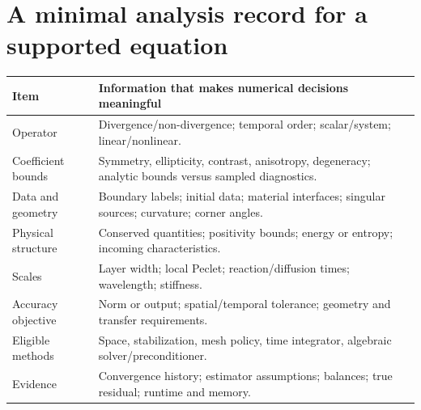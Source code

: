 \documentclass[11pt,a4paper]{article}
\begin{document}
\section{A minimal analysis record for a supported equation}
\begin{tabularx}{\textwidth}{P{0.30\textwidth}Y}
\toprule
Item & Information that makes numerical decisions meaningful\\
\midrule
Operator & Divergence/non-divergence; temporal order; scalar/system; linear/nonlinear.\\
Coefficient bounds & Symmetry, ellipticity, contrast, anisotropy, degeneracy; analytic bounds versus sampled diagnostics.\\
Data and geometry & Boundary labels; initial data; material interfaces; singular sources; curvature; corner angles.\\
Physical structure & Conserved quantities; positivity bounds; energy or entropy; incoming characteristics.\\
Scales & Layer width; local Peclet; reaction/diffusion times; wavelength; stiffness.\\
Accuracy objective & Norm or output; spatial/temporal tolerance; geometry and transfer requirements.\\
Eligible methods & Space, stabilization, mesh policy, time integrator, algebraic solver/preconditioner.\\
Evidence & Convergence history; estimator assumptions; balances; true residual; runtime and memory.\\
\bottomrule
\end{tabularx}
\end{document}
